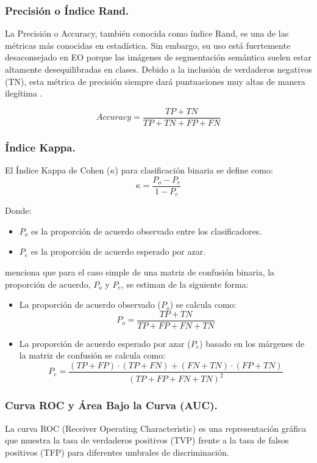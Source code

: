 \subsubsection{Precisión o Índice Rand.}
La Precisión o Accuracy, también conocida como índice Rand, es una de las métricas más conocidas en estadística. Sin embargo, 
su uso está fuertemente desaconsejado en EO porque las imágenes de segmentación semántica suelen estar altamente desequilibradas en clases. 
Debido a la inclusión de verdaderos negativos (TN), esta métrica de precisión siempre dará puntuaciones muy altas de manera ilegítima \citep{muller_towards_2022}.

\begin{equation}
    Accuracy = \frac{TP + TN}{TP + TN + FP + FN}
    \label{eq:accuracy}
\end{equation}

\subsubsection{Índice Kappa.}
El Índice Kappa de Cohen (\(\kappa\)) para clasificación binaria se define como:
\[\kappa = \frac{P_o - P_e}{1 - P_e}\]

Donde:
\begin{itemize}
  \item \(P_o\) es la proporción de acuerdo observado entre los clasificadores.
  \item \(P_e\) es la proporción de acuerdo esperado por azar.
\end{itemize}


\citet{foody_explaining_2020} menciona que para el caso simple de una matriz de confusión binaria, la proporción de acuerdo, $P_{o}$ y $P_{e}$, 
se estiman de la siguiente forma:

\begin{itemize}
  \item La proporción de acuerdo observado (\(P_o\)) se calcula como:
  \[  P_o = \frac{TP + TN}{TP + FP + FN + TN} \]
  \item La proporción de acuerdo esperado por azar (\(P_e\))  basado en los márgenes de la matriz de confusión se calcula como:
  \[P_e = \frac{(TP + FP) \cdot (TP + FN) + (FN + TN) \cdot (FP + TN)}{(TP + FP + FN + TN)^2} \]
\end{itemize}

\subsubsection{Curva ROC y Área Bajo la Curva (AUC).}
La curva ROC (Receiver Operating Characteristic) es una representación gráfica que muestra la tasa de verdaderos positivos (TVP) frente a la tasa de falsos positivos (TFP) 
para diferentes umbrales de discriminación. 

